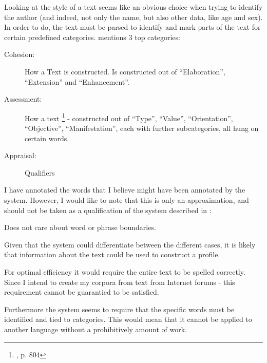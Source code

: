 {\label{stylistic}
Looking at the style of a text seems like an obvious choice when trying to identify the author (and indeed, not only the name, but also other data, like age and sex). In order to do, the text must be parsed to identify and mark parts of the text for certain predefined categories. \cite{style} mentions 3 top categories: 
\begin{description}
\item[Cohesion:] How a Text is constructed. Is constructed out of ``Elaboration'', ``Extension'' and ``Enhancement''.
\item[Assessment:] How a text \footnote{\cite{style}, p. 804} - constructed out of  ``Type'', ``Value'', ``Orientation'', ``Objective'', ``Manifestation'', each with further subcategories, all hung on certain words.
\item[Appraisal:] Qualifiers
\end{description}
}
{
I have annotated the words that I believe might have been annotated by the system. However, I would like to note that this is only an approximation, and should not be taken as a qualification of the system described in \cite{style}:\\
}  
{
\item Does not care about word or phrase boundaries.
\item Given that the system could differentiate between the different cases, it is likely that information about the text could be used to construct a profile.
}{
\item For optimal efficiency it would require the entire text to be spelled correctly. Since I intend to create my corpora from text from Internet forums - this requirement cannot be guarantied to be satisfied.
\item Furthermore the system seems to require that the specific words must be identified and tied to categories. This would mean that it cannot be applied to another language without a prohibitively amount of work.
} 

